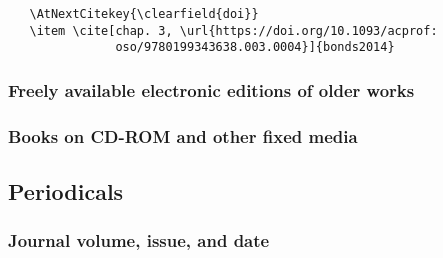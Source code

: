 \documentclass[11pt,letterpaper,oneside]{article}
\begin{document}
\begin{verbatim}
   \AtNextCitekey{\clearfield{doi}}
   \item \cite[chap. 3, \url{https://doi.org/10.1093/acprof:
               oso/9780199343638.003.0004}]{bonds2014}
\end{verbatim}

\begin{citebib}
\item \cite[chap. 3, \url{https://doi.org/10.1093/acprof:oso/9780199343638.003.0004}]{bonds2014}
\item \cite[59]{lystra2004}
\item \cite[chap. 11, \url{https://doi.org/10.1093/acprof:oso/9780199343638.003.0012}]{bonds2014}
\item \cite[60--61]{lystra2004}
\end{citebib}

\subsubsection{Freely available electronic editions of older works}

\begin{citebib}
\item \cite{james2008}
\end{citebib}

\subsubsection{Books on CD-ROM and other fixed media}
\label{14.163}

\begin{citebib}
\item \cite[1.4]{chicago2003}
\end{citebib}

\setcounter{subsection}{5}
\subsection{Periodicals}
\setcounter{subsection}{14}

\setcounter{subsubsection}{170}
\subsubsection{Journal volume, issue, and date}
\end{document}
